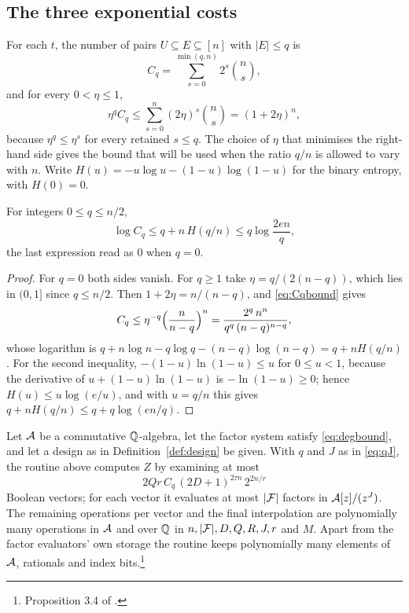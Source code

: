 \subsection{The three exponential costs}
For each $t$, the number of pairs $U\subseteq E\subseteq[n]$ with $|E|\le q$ is
\begin{equation}\label{eq:Cq}
  C_q=\sum_{s=0}^{\min(q,n)}2^{s}\binom{n}{s},
\end{equation}
and for every $0<\eta\le1$,
\begin{equation}\label{eq:Cqbound}
  \eta^{q}C_q\le\sum_{s=0}^{n}(2\eta)^s\binom ns=(1+2\eta)^n ,
\end{equation}
because $\eta^q\le\eta^s$ for every retained $s\le q$. The choice of $\eta$
that minimises the right-hand side gives the bound that will be used when the
ratio $q/n$ is allowed to vary with $n$. Write
$H(u)=-u\log u-(1-u)\log(1-u)$ for the binary entropy, with $H(0)=0$.

\begin{lemma}\label{lem:entropy}
For integers $0\le q\le n/2$,
\begin{equation}\label{eq:Cqentropy}
  \log C_q\le q+n\,H(q/n)\le q\log\frac{2en}{q},
\end{equation}
the last expression read as $0$ when $q=0$.
\end{lemma}

\begin{proof}
For $q=0$ both sides vanish. For $q\ge1$ take $\eta=q/(2(n-q))$, which lies in
$(0,1]$ since $q\le n/2$. Then $1+2\eta=n/(n-q)$, and \eqref{eq:Cqbound} gives
\[
  C_q\le\eta^{-q}\Bigl(\frac{n}{n-q}\Bigr)^{n}
  =\frac{2^q\,n^n}{q^q\,(n-q)^{n-q}} ,
\]
whose logarithm is $q+n\log n-q\log q-(n-q)\log(n-q)=q+nH(q/n)$. For the second
inequality, $-(1-u)\ln(1-u)\le u$ for $0\le u<1$, because the derivative of
$u+(1-u)\ln(1-u)$ is $-\ln(1-u)\ge0$; hence $H(u)\le u\log(e/u)$, and with $u=q/n$
this gives $q+nH(q/n)\le q+q\log(en/q)$.
\end{proof}

\begin{proposition}\label{prop:routine}
Let $\mathcal{A}$ be a commutative $\mathbb{Q}$-algebra, let the factor system satisfy
\eqref{eq:degbound}, and let a design as in Definition~\ref{def:design} be given.
With $q$ and $J$ as in \eqref{eq:qJ}, the routine above computes $Z$ by examining
at most
\begin{equation}\label{eq:routinecost}
  2Qr\,C_q\,(2D+1)^{2\tau n}\,2^{2n/r}
\end{equation}
Boolean vectors; for each vector it evaluates at most $|\mathcal{F}|$ factors in
$\mathcal{A}[z]/(z^J)$. The remaining operations per vector and the final interpolation
are polynomially many operations in $\mathcal{A}$ and over $\mathbb{Q}$ in $n,|\mathcal{F}|,D,Q,R,J,r$ and
$M$. Apart from the factor evaluators' own storage the routine keeps polynomially
many elements of $\mathcal{A}$, rationals and index bits.\footnote{Proposition 3.4 of
\cite{OAI26}.}
\end{proposition}

